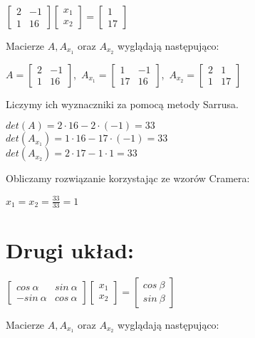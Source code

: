 \documentclass{article}
\begin{document}
\begin{center}
    $\begin{bmatrix}2&-1\\1&16\end{bmatrix}
    \begin{bmatrix}x_1\\x_2\end{bmatrix}=
    \begin{bmatrix}1\\17\end{bmatrix}$
\end{center}
\noindent
Macierze $A, A_{x_1}$ oraz $A_{x_2}$ wyglądają następująco:

\begin{center}
    $A = \begin{bmatrix}2&-1\\1&16\end{bmatrix}$,\ 
    $A_{x_1} = \begin{bmatrix}1&-1\\17&16\end{bmatrix}$,\ 
    $A_{x_2} = \begin{bmatrix}2&1\\1&17\end{bmatrix}$

\end{center}
\noindent
Liczymy ich wyznaczniki za pomocą metody Sarrusa.

\begin{center}
    $det(A) = 2 \cdot 16 - 2 \cdot (-1) = 33$\\
    $det( A_{x_1} ) = 1 \cdot 16 - 17 \cdot (-1) = 33$\\
    $det( A_{x_2} ) = 2 \cdot 17 - 1 \cdot 1 = 33$
\end{center}
\noindent
Obliczamy rozwiązanie korzystając ze wzorów Cramera:
\begin{center}
    $x_1 = x_2 = \frac{33}{33} = 1$\\
\end{center}

\section*{Drugi układ:}

\begin{center}
    $\begin{bmatrix}cos\ \alpha&sin\ \alpha\\-sin\ \alpha&cos\ \alpha\end{bmatrix}
    \begin{bmatrix}x_1\\x_2\end{bmatrix}=
    \begin{bmatrix}cos\ \beta\\sin\ \beta\end{bmatrix}$
\end{center}
\noindent
Macierze $A, A_{x_1}$ oraz $A_{x_2}$ wyglądają następująco:
\end{document}
